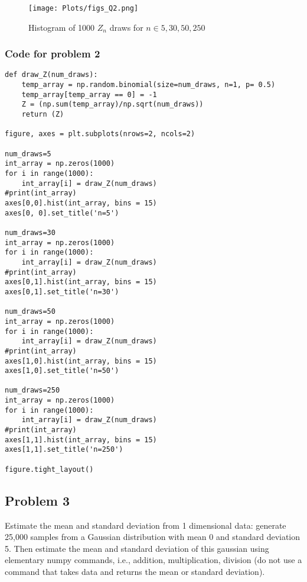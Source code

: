 \documentclass[12pt]{article}%
\begin{document}
\begin{figure}[h]
\texttt{[image: Plots/figs\_Q2.png]}
\centering
\caption{Histogram of 1000 $Z_n$ draws for $n \in {5, 30, 50, 250}$}
\label{fig:hist_Q2}
\centering
\end{figure}

\subsubsection{Code for problem 2}
\begin{lstlisting}
def draw_Z(num_draws):
    temp_array = np.random.binomial(size=num_draws, n=1, p= 0.5)
    temp_array[temp_array == 0] = -1
    Z = (np.sum(temp_array)/np.sqrt(num_draws))
    return (Z)

figure, axes = plt.subplots(nrows=2, ncols=2)

num_draws=5
int_array = np.zeros(1000)
for i in range(1000):
    int_array[i] = draw_Z(num_draws)
#print(int_array)
axes[0,0].hist(int_array, bins = 15)
axes[0, 0].set_title('n=5')

num_draws=30
int_array = np.zeros(1000)
for i in range(1000):
    int_array[i] = draw_Z(num_draws)
#print(int_array)
axes[0,1].hist(int_array, bins = 15)
axes[0,1].set_title('n=30')

num_draws=50
int_array = np.zeros(1000)
for i in range(1000):
    int_array[i] = draw_Z(num_draws)
#print(int_array)
axes[1,0].hist(int_array, bins = 15)
axes[1,0].set_title('n=50')

num_draws=250
int_array = np.zeros(1000)
for i in range(1000):
    int_array[i] = draw_Z(num_draws)
#print(int_array)
axes[1,1].hist(int_array, bins = 15)
axes[1,1].set_title('n=250')

figure.tight_layout()
\end{lstlisting}


\subsection{Problem 3}

Estimate the mean and standard deviation from 1 dimensional data: generate 25,000 samples from a Gaussian distribution with mean 0 and standard deviation 5. Then estimate the mean and standard deviation of this gaussian using elementary numpy commands, i.e., addition, multiplication, division (do not use a command that takes data and returns the mean or standard deviation).\\
\end{document}
